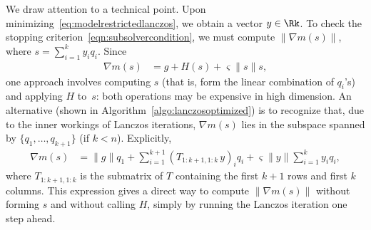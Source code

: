 We draw attention to a technical point. Upon minimizing~\eqref{eq:modelrestrictedlanczos}, we obtain a vector $y \in \Rk$. To check the stopping criterion~\eqref{eqn:subsolvercondition}, we must compute $\|\nabla m(s)\|$, where $s = \sum_{i=1}^k y_i q_i$. Since
\begin{align}
	\nabla m(s) & = g + H(s) + \varsigma \|s\| s,
\end{align}
one approach involves computing $s$ (that is, form the linear combination of $q_i$'s) and applying $H$ to~$s$: both operations may be expensive in high dimension. An alternative (shown in Algorithm~\ref{algo:lanczosoptimized}) is to recognize that, due to the inner workings of Lanczos iterations, $\nabla m(s)$ lies in the subspace spanned by $\{q_1, \ldots, q_{k+1}\}$ (if $k < n$). Explicitly, %
\begin{align}
	\nabla m(s) & = \|g\|q_1 + \sum_{i = 1}^{k+1} (T_{1:k+1,1:k}^{} \, y)_i q_i + \varsigma\|y\| \sum_{i=1}^{k}y_iq_i,
	\label{eqn:subsolvernormofgrad}
\end{align}
where $T_{1:k+1,1:k}$ is the submatrix of $T$ containing the first $k+1$ rows and first $k$ columns.
This expression gives a direct way to compute $\|\nabla m(s)\|$ without forming $s$ and without calling $H$,
simply by running the Lanczos iteration one step ahead.


